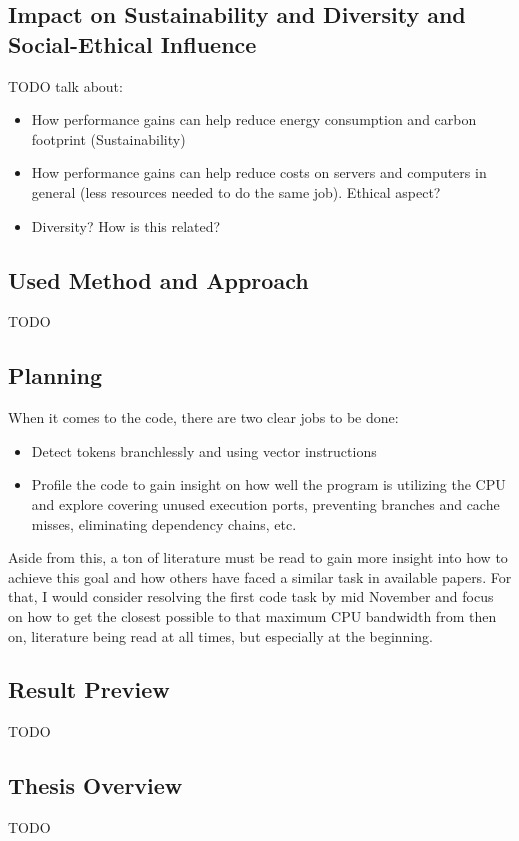 \documentclass[12pt]{article}
\begin{document}
	\subsection{Impact on Sustainability and Diversity and Social-Ethical Influence}
		TODO talk about:
		\begin{itemize}
			\item How performance gains can help reduce energy consumption and carbon footprint (Sustainability)
			\item How performance gains can help reduce costs on servers and computers in general (less resources needed to do the same job). Ethical aspect?
			\item Diversity? How is this related?
		\end{itemize}
	\subsection{Used Method and Approach}
	TODO
	\subsection{Planning}
	When it comes to the code, there are two clear jobs to be done:
	\begin{itemize}
		\item Detect tokens branchlessly and using vector instructions
		\item Profile the code to gain insight on how well the program is utilizing the CPU and explore covering unused execution ports, preventing branches and cache misses, eliminating dependency chains, etc.
	\end{itemize}
	Aside from this, a ton of literature must be read to gain more insight into how to achieve this goal and how others have faced a similar task in available papers.
	For that, I would consider resolving the first code task by mid November and focus on how to get the closest possible to that maximum CPU bandwidth from then on, literature being read at all times, but especially at the beginning.
	\subsection{Result Preview}
	TODO
	\subsection{Thesis Overview}
	TODO
	
	
	
	
	
\end{document}
